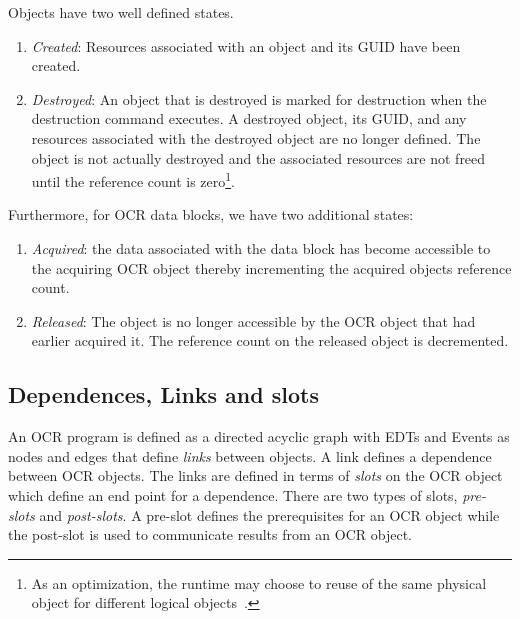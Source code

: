 Objects have two well defined states.
\begin{enumerate}
\item \emph{Created}: Resources associated with an object and its GUID
have been created.
\item \emph{Destroyed}: An object that is destroyed is marked for
destruction when the destruction command executes. A destroyed object, its GUID,
and any resources associated with the destroyed object are no longer
defined. The object is not actually destroyed and the associated
resources are not freed until the reference count is zero\footnote{As
an optimization, the runtime may choose to reuse of the same physical
object for different logical objects~\cite{USBCSS12,SbKS12}.}.
%
\end{enumerate}
Furthermore, for OCR data blocks, we have two additional states:
\begin{enumerate}
\item \emph{Acquired}: the data associated with the data block has
become accessible to the acquiring OCR object thereby incrementing the
acquired objects reference count.
\item \emph{Released}: The object is no longer accessible by the OCR
object that had earlier acquired it. The reference count on the
released object is decremented.
\end{enumerate}



\subsection{Dependences, Links and slots}
\label{sec:OCRlinks}

An OCR program is defined as a directed acyclic graph
with EDTs and Events as nodes and edges that define
\emph{links} between objects. A link defines a dependence
between OCR objects. The links are defined in terms of
\emph{slots} on the OCR object which define an end
point for a dependence.
There are two
types of slots, \emph{pre-slots} and \emph{post-slots}.   A pre-slot defines the prerequisites for
an OCR object while the post-slot is used to communicate results from an OCR object.

